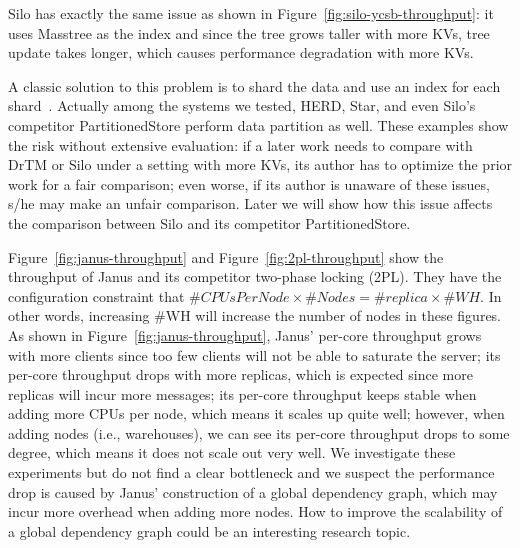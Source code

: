 Silo has exactly the same issue as shown in Figure~\ref{fig:silo-ycsb-throughput}:
it uses Masstree as the index and since the tree grows taller with more KVs, tree update
takes longer, which causes performance degradation with more KVs.

A classic solution to this problem is to shard the data and use an index for each
shard~\cite{Decandia07Dynamo,chang06bigtable,Lee2021ShardManager}. Actually among the systems we tested,
HERD, Star, and even Silo's competitor PartitionedStore perform data partition as well.
These examples show the risk without extensive evaluation:
if a later work needs to compare with DrTM or Silo under a setting with more KVs,
its author has to optimize the prior work for a fair comparison; even worse,
if its author is unaware of these issues, s/he may make an unfair comparison.
Later we will show how this issue affects the comparison between Silo and
its competitor PartitionedStore.




Figure~\ref{fig:janus-throughput} and Figure~\ref{fig:2pl-throughput} show the throughput of Janus
and its competitor two-phase locking (2PL). They have the configuration
constraint that $\#CPUsPerNode \times \#Nodes = \#replica \times \#WH$.
In other words, increasing \#WH will increase the number of nodes in these figures.
As shown in Figure~\ref{fig:janus-throughput}, Janus' per-core throughput grows
with more clients since too few clients will not be able to saturate the server;
its per-core throughput drops with more replicas, which is expected since more
replicas will incur more messages; its per-core throughput keeps stable when
adding more CPUs per node, which means it scales up quite well; however, when
adding nodes (i.e., warehouses), we can see its per-core throughput drops to some degree, which
means it does not scale out very well. We investigate these
experiments but do not find a clear bottleneck and we suspect the performance drop
is caused by Janus' construction of a global dependency graph, which may incur
more overhead when adding more nodes. How to improve the scalability
of a global dependency graph could be an interesting research topic.

